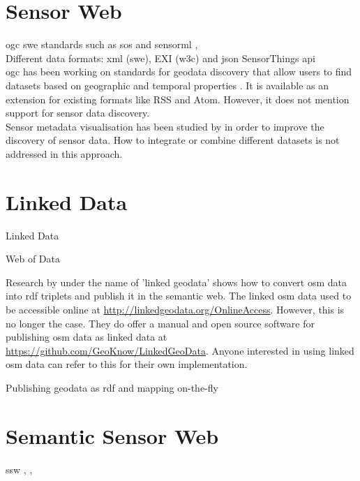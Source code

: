 \iffalse
\section{Sensor Web}

\ac{ogc} \ac{swe} standards such as \ac{sos} and \ac{sensorml} \citep{SW:OGC}, \citep{SW:Botts} \\

Different data formats: \ac{xml} (\ac{swe}), EXI (\ac{w3c}) and \ac{json} SensorThings \ac{api} \citep{IOT:Zanelli} \\

\ac{ogc} has been working on standards for geodata discovery that allow users to find datasets based on geographic and temporal properties \citep{SW:OGC2}. It is available as an extension for existing formats like RSS and Atom. However, it does not mention support for sensor data discovery. \\

Sensor metadata visualisation has been studied by \cite{SW:Yoo} in order to improve the discovery of sensor data. How to integrate or combine different datasets is not addressed in this approach. 


\section{Linked Data}

Linked Data \citep{LD:Berners-lee}

Web of Data \cite{LD:Bizer} 

Research by \cite{LD:Auer} under the name of 'linked geodata' shows how to convert \ac{osm} data into \ac{rdf} triplets and publish it in the semantic web. The linked \ac{osm} data used to be accessible online at \url{http://linkedgeodata.org/OnlineAccess}. However, this is no longer the case. They do offer a manual and open source software for publishing \ac{osm} data as linked data at \url{https://github.com/GeoKnow/LinkedGeoData}. Anyone interested in using linked \ac{osm} data can refer to this for their own implementation.     

Publishing geodata as \ac{rdf} and mapping on-the-fly \citep{LD:Missier}


\section{Semantic Sensor Web}

\ac{ssw} \citep{SSW:Sheth}, \citep{SSW:deMel}, \citep{SSW:Bakillah} \\ 

